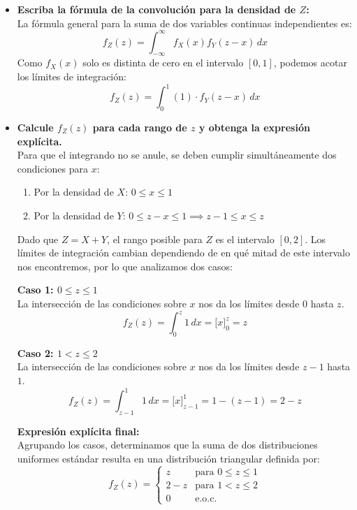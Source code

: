 \documentclass[10pt,a4paper]{book}
\begin{document}
\begin{itemize}
    \item[\textbf{a)}] \textbf{Escriba la fórmula de la convolución para la densidad de $Z$:} \\
    La fórmula general para la suma de dos variables continuas independientes es:
    \[ f_Z(z) = \int_{-\infty}^{\infty} f_X(x) f_Y(z - x) \, dx \]
    Como $f_X(x)$ solo es distinta de cero en el intervalo $[0, 1]$, podemos acotar los límites de integración:
    \[ f_Z(z) = \int_{0}^{1} (1) \cdot f_Y(z - x) \, dx \]

    \item[\textbf{b)}] \textbf{Calcule $f_Z(z)$ para cada rango de $z$ y obtenga la expresión explícita.} \\
    Para que el integrando no se anule, se deben cumplir simultáneamente dos condiciones para $x$:
    \begin{enumerate}
        \item Por la densidad de $X$: $0 \le x \le 1$
        \item Por la densidad de $Y$: $0 \le z - x \le 1 \implies z - 1 \le x \le z$
    \end{enumerate}
    
    Dado que $Z = X + Y$, el rango posible para $Z$ es el intervalo $[0, 2]$. Los límites de integración cambian dependiendo de en qué mitad de este intervalo nos encontremos, por lo que analizamos dos casos:

    \textbf{Caso 1: $0 \le z \le 1$} \\
    La intersección de las condiciones sobre $x$ nos da los límites desde $0$ hasta $z$.
    \[ f_Z(z) = \int_{0}^{z} 1 \, dx = \Big[ x \Big]_0^z = z \]

    \textbf{Caso 2: $1 < z \le 2$} \\
    La intersección de las condiciones sobre $x$ nos da los límites desde $z - 1$ hasta $1$.
    \[ f_Z(z) = \int_{z-1}^{1} 1 \, dx = \Big[ x \Big]_{z-1}^1 = 1 - (z - 1) = 2 - z \]

    \textbf{Expresión explícita final:} \\
    Agrupando los casos, determinamos que la suma de dos distribuciones uniformes estándar resulta en una distribución triangular definida por:
    \[ f_Z(z) = \begin{cases}
        z & \text{para } 0 \le z \le 1 \\
        2 - z & \text{para } 1 < z \le 2 \\
        0 & \text{e.o.c.}
    \end{cases} \]
\end{itemize}
\end{document}
